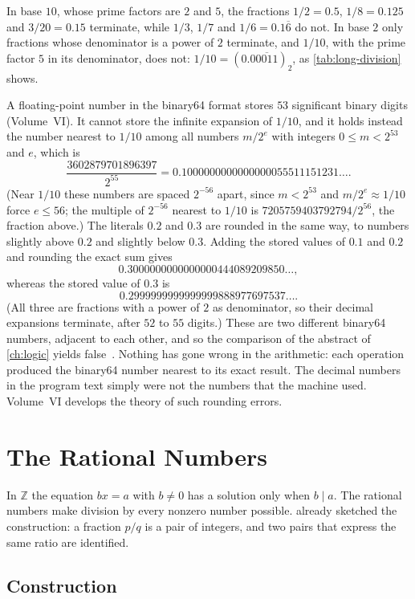 In base $10$, whose prime factors are $2$ and $5$, the fractions $1/2=0.5$, $1/8=0.125$ and $3/20=0.15$ terminate, while $1/3$, $1/7$ and $1/6=0.1\overline6$ do not. In base $2$ only fractions whose denominator is a power of $2$ terminate, and $1/10$, with the prime factor $5$ in its denominator, does not: $1/10=(0.0\overline{0011})_2$, as \cref{tab:long-division} shows.

A floating-point number in the binary64 format stores $53$ significant binary digits (Volume~VI). It cannot store the infinite expansion of $1/10$, and it holds instead the number nearest to $1/10$ among all numbers $m/2^e$ with integers $0\le m<2^{53}$ and $e$, which is
\[
\frac{3602879701896397}{2^{55}}=0.1000000000000000055511151231\ldots.
\]
(Near $1/10$ these numbers are spaced $2^{-56}$ apart, since $m<2^{53}$ and $m/2^e\approx1/10$ force $e\le56$; the multiple of $2^{-56}$ nearest to $1/10$ is $7205759403792794/2^{56}$, the fraction above.) The literals $0.2$ and $0.3$ are rounded in the same way, to numbers slightly above $0.2$ and slightly below $0.3$. Adding the stored values of $0.1$ and $0.2$ and rounding the exact sum gives
\[
0.3000000000000000444089209850\ldots,
\]
whereas the stored value of $0.3$ is
\[
0.2999999999999999888977697537\ldots.
\]
(All three are fractions with a power of $2$ as denominator, so their decimal expansions terminate, after $52$ to $55$ digits.) These are two different binary64 numbers, adjacent to each other, and so the comparison  of the abstract of \cref{ch:logic} yields false~\cite{goldberg1991,ieee754-2019}. Nothing has gone wrong in the arithmetic: each operation produced the binary64 number nearest to its exact result. The decimal numbers in the program text simply were not the numbers that the machine used. Volume~VI develops the theory of such rounding errors.

\section{The Rational Numbers}
\label{sec:rationals}

In $\mathbb Z$ the equation $bx=a$ with $b\ne0$ has a solution only when $b\mid a$. The rational numbers make division by every nonzero number possible.  already sketched the construction: a fraction $p/q$ is a pair of integers, and two pairs that express the same ratio are identified.

\subsection{Construction}

